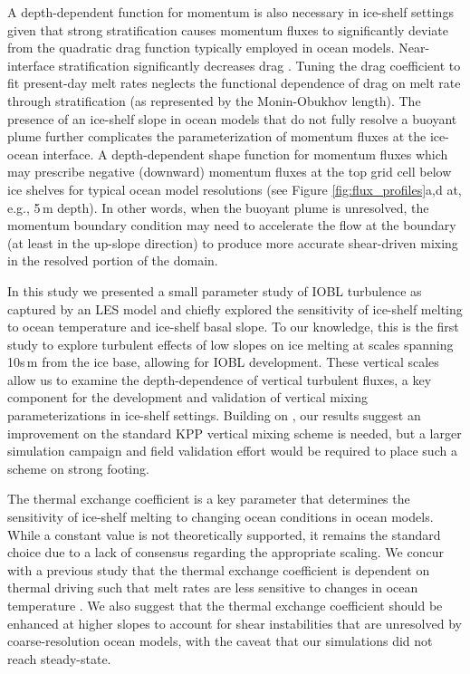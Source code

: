 \documentclass[tc, manuscript]{copernicus}
\begin{document}
A depth-dependent function for momentum is also necessary in ice-shelf settings given that strong stratification causes momentum fluxes to significantly deviate from the quadratic drag function typically employed in ocean models. Near-interface stratification significantly decreases drag \citep{garcia-villalba_turbulence_2011, mcphee_revisiting_2008}. Tuning the drag coefficient to fit present-day melt rates neglects the functional dependence of drag on melt rate through stratification (as represented by the Monin-Obukhov length). The presence of an ice-shelf slope in ocean models that do not fully resolve a buoyant plume further complicates the parameterization of momentum fluxes at the ice-ocean interface. A depth-dependent shape function for momentum fluxes which may prescribe negative (downward) momentum fluxes at the top grid cell below ice shelves for typical ocean model resolutions (see Figure \ref{fig:flux_profiles}a,d at, e.g., 5\,\unit{m} depth). In other words, when the buoyant plume is unresolved, the momentum boundary condition may need to accelerate the flow at the boundary (at least in the up-slope direction) to produce more accurate shear-driven mixing in the resolved portion of the domain. 

\conclusions

In this study we presented a small parameter study of IOBL turbulence as captured by an LES model and chiefly explored the sensitivity of ice-shelf melting to ocean temperature and ice-shelf basal slope. To our knowledge, this is the first study to explore turbulent effects of low slopes on ice melting at scales spanning 10s\,\unit{m} from the ice base, allowing for IOBL development. These vertical scales allow us to examine the depth-dependence of vertical turbulent fluxes, a key component for the development and validation of vertical mixing parameterizations in ice-shelf settings. Building on \citet{jenkins_shear_2021}, our results suggest an improvement on the standard KPP vertical mixing scheme is needed, but a larger simulation campaign and field validation effort would be required to place such a scheme on strong footing. 

The thermal exchange coefficient is a key parameter that determines the sensitivity of ice-shelf melting to changing ocean conditions in ocean models. While a constant value is not theoretically supported, it remains the standard choice due to a lack of consensus regarding the appropriate scaling. We concur with a previous study that the thermal exchange coefficient is dependent on thermal driving such that melt rates are less sensitive to changes in ocean temperature \citep{vreugdenhil_stratification_2019}. We also suggest that the thermal exchange coefficient should be enhanced at higher slopes to account for shear instabilities that are unresolved by coarse-resolution ocean models, with the caveat that our simulations did not reach steady-state. 
\end{document}

